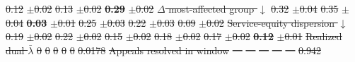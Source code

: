 \documentclass[utf8]{FrontiersinHarvard}
\providecommand{\DIFdel}[1]{{\protect\color{red}\sout{#1}}}                      %
\providecommand{\DIFdelFL}[1]{\DIFdel{#1}} %
\begin{document}
\DIFdelFL{0.12 }%
\DIFdelFL{$\pm$0.02}%
\DIFdelFL{0.13 }%
\DIFdelFL{$\pm$0.02}%
\textbf{\DIFdelFL{0.29}} %
\DIFdelFL{$\pm$0.02}%
\DIFdelFL{$\Delta$ most-affected group $\downarrow$ }%
\DIFdelFL{0.32 }%
\DIFdelFL{$\pm$0.04}%
\DIFdelFL{0.35 }%
\DIFdelFL{$\pm$0.04}%
\textbf{\DIFdelFL{0.03}} %
\DIFdelFL{$\pm$0.01}%
\DIFdelFL{0.25 }%
\DIFdelFL{$\pm$0.03}%
\DIFdelFL{0.22 }%
\DIFdelFL{$\pm$0.03}%
\DIFdelFL{0.09 }%
\DIFdelFL{$\pm$0.02}%
\DIFdelFL{Service-equity dispersion $\downarrow$ }%
\DIFdelFL{0.19 }%
\DIFdelFL{$\pm$0.02}%
\DIFdelFL{0.22 }%
\DIFdelFL{$\pm$0.02}%
\DIFdelFL{0.15 }%
\DIFdelFL{$\pm$0.02}%
\DIFdelFL{0.18 }%
\DIFdelFL{$\pm$0.02}%
\DIFdelFL{0.17 }%
\DIFdelFL{$\pm$0.02}%
\textbf{\DIFdelFL{0.12}} %
\DIFdelFL{$\pm$0.01}%
\DIFdelFL{Realized dual $\bar\lambda$ }%
\DIFdelFL{0 }%
\DIFdelFL{0 }%
\DIFdelFL{0 }%
\DIFdelFL{0 }%
\DIFdelFL{0 }%
\DIFdelFL{0.0178}%
\DIFdelFL{Appeals resolved in window }%
\DIFdelFL{--- }%
\DIFdelFL{--- }%
\DIFdelFL{--- }%
\DIFdelFL{--- }%
\DIFdelFL{--- }%
\DIFdelFL{0.942}%
\end{document}

